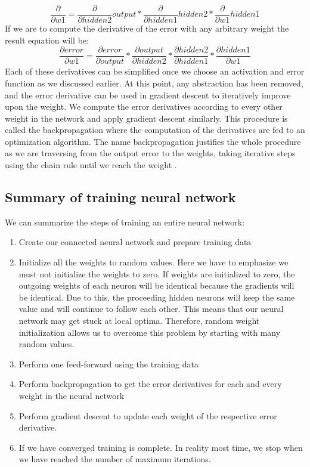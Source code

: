 \begin{equation*}
\frac{\partial}{\partial w1}= \frac{\partial}{\partial hidden2}output* \frac{\partial}{\partial hidden1}hidden2 * \frac{\partial}{\partial w1}hidden1
\end{equation*}
If we are to compute the derivative of the error with any arbitrary weight the result equation will be:
\begin{equation*}
\frac{\partial error}{\partial w1}= \frac{\partial error}{\partial output}* \frac{\partial output}{\partial hidden2}* \frac{\partial hidden2}{\partial hidden1}*\frac{\partial hidden1}{\partial w1}
\end{equation*}
Each of these derivatives can be simplified once we choose an activation and error function as we discussed earlier. At this point, any abstraction has been removed, and the error derivative can be used in gradient descent to iteratively improve upon the weight. We compute the error derivatives according to every other weight in the network and apply gradient descent similarly. This procedure is called the backpropagation where the computation of the derivatives are fed to an optimization algorithm. The name backpropagation justifies the whole procedure as we are traversing from the output error to the weights, taking iterative steps using the chain rule until we reach the weight \cite{ayearofai}.\\
\subsection{Summary of training neural network}
We can summarize the steps of training an entire neural network:
\begin{enumerate}
\item Create our connected neural network and prepare training data
\item Initialize all the weights to random values. Here we have to emphasize we must not initialize the weights to zero. If weights are initialized to zero, the outgoing weights of each neuron will be identical because the gradients will be identical. Due to this, the proceeding hidden neurons will keep the same value and will continue to follow each other. This means that our neural network may get stuck at local optima. Therefore, random weight initialization allows us to overcome this problem by starting with many random values.\cite{ayearofai}
\item Perform one feed-forward using the training data
\item Perform backpropagation to get the error derivatives for each and every weight in the neural network
\item Perform gradient descent to update each weight of the respective error derivative.
\item If we have converged  training is complete. In reality most time, we stop when we have reached the number of maximum iterations. 
\end{enumerate}
